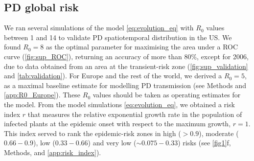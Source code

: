     \subsection{PD global risk}
    We ran several simulations of the model \cref{eq:evolution_eq} with $R_0$
    values between 1 and 14 to validate PD spatiotemporal distribution in the
    US. We found $R_0=8$ as the optimal parameter for maximising the area under
    a ROC curve (\cref{fig:sup_ROC}), returning an accuracy of more than
$80\%$, except for 2006, due to data obtained from an area at the
    transient-risk zone (\cref{fig:sup_validation} and \cref{tab:validation}).
    For Europe and the rest of the world, we derived a $R_0=5$, as a maximal
    baseline estimate for modelling PD transmission (see Methods and
    \cref{app:R0_Europe}). These $R_0$ values should be taken as operating
    estimates for the model.  From the model simulations
    \cref{eq:evolution_eq}, we obtained a risk index $r$ that measures the
    relative exponential growth rate in the population of infected plants
    at the epidemic onset with respect to the maximum growth, $r=1$. This index
    served to rank the epidemic-risk zones in high ($> 0.9$), moderate
    ($0.66-0.9$), low ($0.33-0.66$) and very low ($\sim 0.075-0.33$) risks (see
    \cref{fig1}f, Methods, and \cref{app:risk_index}).

    \begin{table}[H]
        \begin{center}
            \caption[Validation of model predictions]{\textbf{Validation of
                    model predictions.} The items are
                locations
                where PD was present or absent. TP corresponds to true
                positives and TN to true
                negatives according to our model with $R_0=8$. }
            \label{tab:validation}
        \end{center}
    \end{table}

